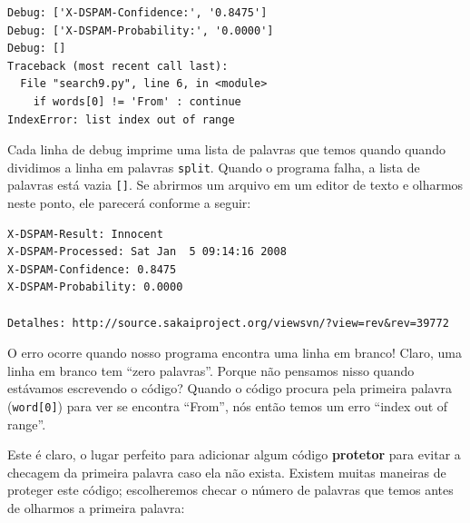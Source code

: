 \begin{enumerate}
\beforeverb
\begin{verbatim}
Debug: ['X-DSPAM-Confidence:', '0.8475']
Debug: ['X-DSPAM-Probability:', '0.0000']
Debug: []
Traceback (most recent call last):
  File "search9.py", line 6, in <module>
    if words[0] != 'From' : continue
IndexError: list index out of range
\end{verbatim}
\afterverb
%

Cada linha de debug imprime uma lista de palavras que temos quando
quando dividimos a linha em palavras {\tt split}. Quando o programa
falha, a lista de palavras está vazia \verb"[]". Se abrirmos um arquivo
em um editor de texto e olharmos neste ponto, ele parecerá conforme a seguir:

\beforeverb
\begin{verbatim}
X-DSPAM-Result: Innocent
X-DSPAM-Processed: Sat Jan  5 09:14:16 2008
X-DSPAM-Confidence: 0.8475
X-DSPAM-Probability: 0.0000

Detalhes: http://source.sakaiproject.org/viewsvn/?view=rev&rev=39772
\end{verbatim}
\afterverb
%

O erro ocorre quando nosso programa encontra uma linha em branco! Claro, uma linha em
branco tem ``zero palavras''. Porque não pensamos nisso quando estávamos escrevendo o código?
Quando o código procura pela primeira palavra (\verb"word[0]") para ver se encontra ``From'',
nós então temos um erro ``index out of range''.

Este é claro, o lugar perfeito para adicionar algum código {\bf protetor} para
evitar a checagem da primeira palavra caso ela não exista.
Existem muitas maneiras de proteger este código; escolheremos checar
o número de palavras que temos antes de olharmos a primeira palavra:


\end{enumerate}
